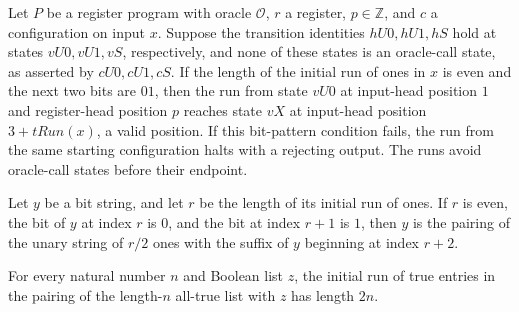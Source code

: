 \begin{lemma}
\label{Complexity.LogProg.valPrefix_run}
\leanok
{}
Let $P$ be a register program with oracle $\mathcal O$, $r$ a register, $p\in\mathbb Z$,
and $c$ a configuration on input $x$. Suppose the transition identities $hU0,hU1,hS$
hold at states $vU0,vU1,vS$, respectively, and none of these states is an oracle-call
state, as asserted by $cU0,cU1,cS$. If the length of the initial run of ones in $x$ is
even and the next two bits are $01$, then the run from state $vU0$ at input-head
position $1$ and register-head position $p$ reaches state $vX$ at input-head position
$3+tRun(x)$, a valid position. If this bit-pattern condition fails, the run from the
same starting configuration halts with a rejecting output. The runs avoid oracle-call
states before their endpoint.
\end{lemma}

\begin{lemma}
\label{Complexity.LogProg.prefix_decomp}
\leanok
{}
Let $y$ be a bit string, and let $r$ be the length of its initial run of ones. If $r$ is
even, the bit of $y$ at index $r$ is $0$, and the bit at index $r+1$ is $1$, then $y$ is
the pairing of the unary string of $r/2$ ones with the suffix of $y$ beginning at index
$r+2$.
\end{lemma}

\begin{lemma}
\label{Complexity.LogProg.tRun_pairEncode}
\leanok
{}
For every natural number $n$ and Boolean list $z$, the initial run of true entries in
the pairing of the length-$n$ all-true list with $z$ has length $2n$.
\end{lemma}


